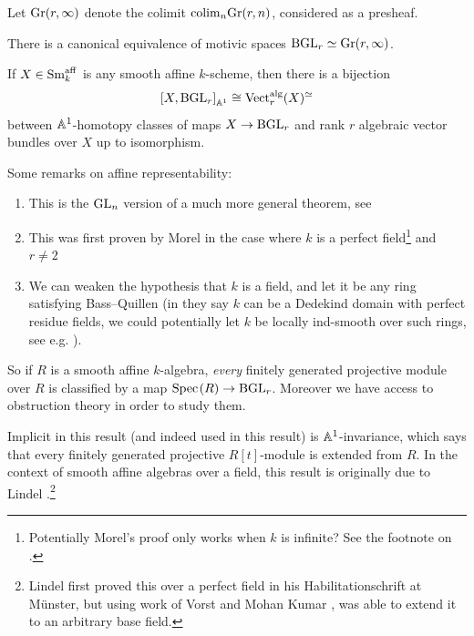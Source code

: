 \documentclass[11pt,openany]{book}
\providecommand{\aff}{\mathrm{aff}}
\begin{document}
\begin{definition} Let $\mathrm{Gr}(r,\infty)$ denote the colimit $\mathrm{colim}_n \mathrm{Gr}(r,n)$, considered as a presheaf.
\end{definition}

\begin{proposition}[{\cite[p.138]{MV}}]
There is a canonical equivalence of motivic spaces $\mathrm{BGL}_r \simeq \mathrm{Gr}(r,\infty)$.
\end{proposition}

\begin{theorem}
If $X \in \Sm_k^\aff$ is any smooth affine $k$-scheme, then there is a bijection
\begin{align*}
    \left[ X, \mathrm{BGL}_r \right]_{\mathbb{A}^1} \cong \mathrm{Vect}_r^{\mathrm{alg}}(X)^{\simeq}
\end{align*}
between $\mathbb{A}^1$-homotopy classes of maps $X \to \mathrm{BGL}_r$ and rank $r$ algebraic vector bundles over $X$ up to isomorphism.
\end{theorem}

\begin{remark} Some remarks on affine representability:
\begin{enumerate}
    \item This is the $\mathrm{GL}_n$ version of a much more general theorem, see \cite{AHW1,AHW2,AHW3}
    \item This was first proven by Morel in the case where $k$ is a perfect field\footnote{Potentially Morel's proof only works when $k$ is infinite? See the footnote on \cite[p.~1925]{AHW1}.} and $r\ne 2$ \cite[8.1(3)]{Morel}
    \item We can weaken the hypothesis that $k$ is a field, and let it be any ring satisfying Bass--Quillen (in \cite{AHW1} they say $k$ can be a Dedekind domain with perfect residue fields, we could potentially let $k$ be locally ind-smooth over such rings, see e.g. \cite[4.2.12]{AHW2}).
\end{enumerate}

\end{remark}



So if $R$ is a smooth affine $k$-algebra, \textit{every} finitely generated projective module over $R$ is classified by a map $\text{Spec}\hspace{0.1em}(R) \to \mathrm{BGL}_r$. Moreover we have access to obstruction theory in order to study them.

Implicit in this result (and indeed used in this result) is $\mathbb{A}^1$-invariance, which says that every finitely generated projective $R[t]$-module is extended from $R$. In the context of smooth affine algebras over a field, this result is originally due to Lindel \cite{Lindel81}.\footnote{Lindel first proved this over a perfect field in his Habilitationschrift at M\"unster, but using work of Vorst and Mohan Kumar \cite{Vorst}, was able to extend it to an arbitrary base field.}
\end{document}
